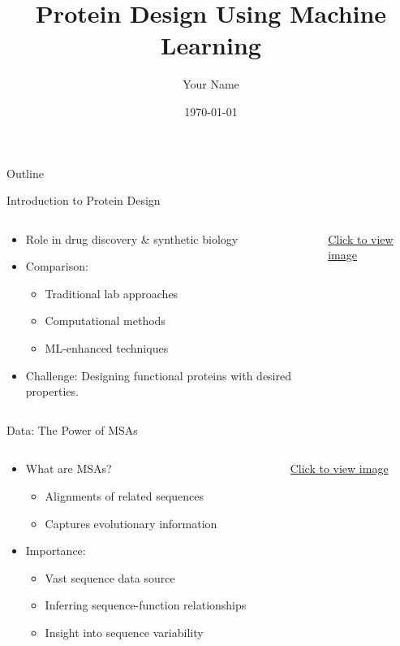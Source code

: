 \documentclass[presentation]{beamer}
\author{Your Name}
\date{\today}
\title{Protein Design Using Machine Learning}
\begin{document}
\maketitle
\begin{frame}{Outline}
\tableofcontents
\end{frame}


\begin{frame}[label={sec:org51a7ea6}]{Introduction to Protein Design}
\begin{columns}
\begin{column}{0.6\columnwidth}
\begin{itemize}
\item Role in drug discovery \& synthetic biology
\item Comparison:
\begin{itemize}
\item Traditional lab approaches
\item Computational methods
\item ML-enhanced techniques
\end{itemize}
\item Challenge: Designing functional proteins with desired properties.
\end{itemize}
\end{column}
\begin{column}{0.4\columnwidth}
\begin{center}
\href{path\_to\_intro\_image}{Click to view image}
\end{center}
\end{column}
\end{columns}
\end{frame}

\begin{frame}[label={sec:orgc2afa0e}]{Data: The Power of MSAs}
\begin{columns}
\begin{column}{0.6\columnwidth}
\begin{itemize}
\item What are MSAs?
\begin{itemize}
\item Alignments of related sequences
\item Captures evolutionary information
\end{itemize}
\item Importance:
\begin{itemize}
\item Vast sequence data source
\item Inferring sequence-function relationships
\item Insight into sequence variability
\end{itemize}
\end{itemize}
\end{column}
\begin{column}{0.4\columnwidth}
\begin{center}
\href{path\_to\_msa\_image}{Click to view image}
\end{center}
\end{column}
\end{columns}
\end{frame}
\end{document}
